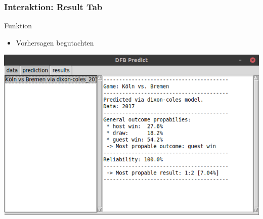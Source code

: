 \documentclass{beamer}
\begin{document}
    \begin{frame}
        \frametitle{Interaktion: Result Tab}
        \begin{block}{Funktion}
            \begin{itemize}
                \item Vorhersagen begutachten
            \end{itemize}
        \end{block}
        \center\includegraphics[scale=.3]{gui_imgs/003.png}
    \end{frame}
\end{document}
